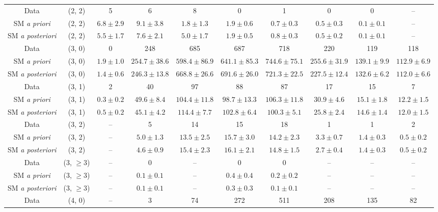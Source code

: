 \begin{table}[h!]
{\begin{tabular}{cccccccccc}
	Data & (2, 2) & 5 & 6 & 8 & 0 & 1 & 0 & 0 & -- \\[0.5ex] 
	SM \textit{a priori} & (2, 2) & $6.8\pm 2.9$ & $9.1\pm 3.8$ & $1.8\pm 1.3$ & $1.9\pm 0.6$ & $0.7\pm 0.3$ & $0.5\pm 0.3$ & $0.1\pm 0.1$ & -- \\[0.5ex] 
	SM \textit{a posteriori} & (2, 2) & $5.5\pm 1.7$ & $7.6\pm 2.1$ & $5.0\pm 1.7$ & $1.9\pm 0.5$ & $0.8\pm 0.3$ & $0.5\pm 0.2$ & $0.1\pm 0.1$ & -- \\[0.5ex] 
	Data & (3, 0) & 0 & 248 & 685 & 687 & 718 & 220 & 119 & 118 \\[0.5ex] 
	SM \textit{a priori} & (3, 0) & $1.9\pm 1.0$ & $254.7\pm 38.6$ & $598.4\pm 86.9$ & $641.1\pm 85.3$ & $744.6\pm 75.1$ & $255.6\pm 31.9$ & $139.1\pm 9.9$ & $112.9\pm 6.9$ \\[0.5ex] 
	SM \textit{a posteriori} & (3, 0) & $1.4\pm 0.6$ & $246.3\pm 13.8$ & $668.8\pm 26.6$ & $691.6\pm 26.0$ & $721.3\pm 22.5$ & $227.5\pm 12.4$ & $132.6\pm 6.2$ & $112.0\pm 6.6$ \\[0.5ex] 
	Data & (3, 1) & 2 & 40 & 97 & 88 & 87 & 17 & 15 & 7 \\[0.5ex] 
	SM \textit{a priori} & (3, 1) & $0.3\pm 0.2$ & $49.6\pm 8.4$ & $104.4\pm 11.8$ & $98.7\pm 13.3$ & $106.3\pm 11.8$ & $30.9\pm 4.6$ & $15.1\pm 1.8$ & $12.2\pm 1.5$ \\[0.5ex] 
	SM \textit{a posteriori} & (3, 1) & $0.5\pm 0.2$ & $45.1\pm 4.2$ & $114.4\pm 7.7$ & $102.8\pm 6.4$ & $100.3\pm 5.1$ & $25.8\pm 2.4$ & $14.6\pm 1.4$ & $12.0\pm 1.5$ \\[0.5ex] 
	Data & (3, 2) & -- & 5 & 14 & 15 & 18 & 1 & 1 & 2 \\[0.5ex] 
	SM \textit{a priori} & (3, 2) & -- & $5.0\pm 1.3$ & $13.5\pm 2.5$ & $15.7\pm 3.0$ & $14.2\pm 2.3$ & $3.3\pm 0.7$ & $1.4\pm 0.3$ & $0.5\pm 0.2$ \\[0.5ex] 
	SM \textit{a posteriori} & (3, 2) & -- & $4.6\pm 0.9$ & $15.4\pm 2.3$ & $16.1\pm 2.1$ & $14.8\pm 1.5$ & $2.7\pm 0.4$ & $1.4\pm 0.3$ & $0.5\pm 0.2$ \\[0.5ex] 
	Data & (3, $\ge3$) & -- & 0 & -- & 0 & 0 & -- & -- & -- \\[0.5ex] 
	SM \textit{a priori} & (3, $\ge3$) & -- & $0.1\pm 0.1$ & -- & $0.4\pm 0.4$ & $0.2\pm 0.2$ & -- & -- & -- \\[0.5ex] 
	SM \textit{a posteriori} & (3, $\ge3$) & -- & $0.1\pm 0.1$ & -- & $0.3\pm 0.3$ & $0.1\pm 0.1$ & -- & -- & -- \\[0.5ex] 
	Data & (4, 0) & -- & 3 & 74 & 272 & 511 & 208 & 135 & 82 \\[0.5ex] 

\end{tabular}}
\end{table}
